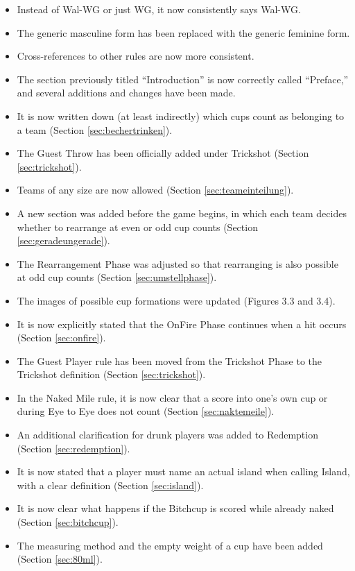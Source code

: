 \documentclass[a5paper, 12pt]{book}
\begin{document}
\begin{itemize}
    \item Instead of Wal-WG or just WG, it now consistently says Wal-WG\texttrademark.
    \item The generic masculine form has been replaced with the generic feminine form.
    \item Cross-references to other rules are now more consistent.
    \item The section previously titled “Introduction” is now correctly called “Preface,” and several additions and changes have been made.
    \item It is now written down (at least indirectly) which cups count as belonging to a team (Section \ref{sec:bechertrinken}).
    \item The Guest Throw has been officially added under Trickshot (Section \ref{sec:trickshot}).
    \item Teams of any size are now allowed (Section \ref{sec:teameinteilung}).
    \item A new section was added before the game begins, in which each team decides whether to rearrange at even or odd cup counts (Section \ref{sec:geradeungerade}).
    \item The Rearrangement Phase was adjusted so that rearranging is also possible at odd cup counts (Section \ref{sec:umstellphase}).
    \item The images of possible cup formations were updated (Figures 3.3 and 3.4).
    \item It is now explicitly stated that the OnFire Phase continues when a hit occurs (Section \ref{sec:onfire}).
    \item The Guest Player rule has been moved from the Trickshot Phase to the Trickshot definition (Section \ref{sec:trickshot}).
    \item In the Naked Mile rule, it is now clear that a score into one’s own cup or during Eye to Eye does not count (Section \ref{sec:naktemeile}).
    \item An additional clarification for drunk players was added to Redemption (Section \ref{sec:redemption}).
    \item It is now stated that a player must name an actual island when calling Island, with a clear definition (Section \ref{sec:island}).
    \item It is now clear what happens if the Bitchcup is scored while already naked (Section \ref{sec:bitchcup}).
    \item The measuring method and the empty weight of a cup have been added (Section \ref{sec:80ml}).

\end{itemize}
\end{document}
